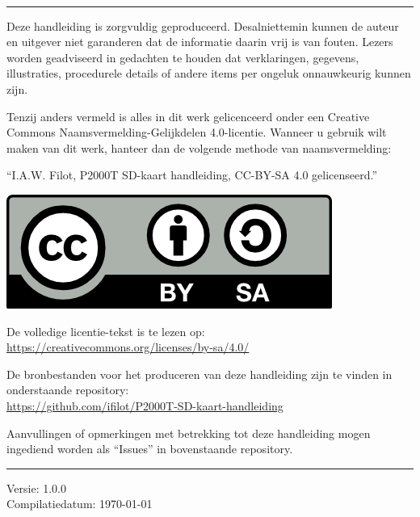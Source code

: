 ~\vfill

\begin{minipage}{1.0\textwidth}

\thispagestyle{empty}
\setlength{\parindent}{0pt}
\setlength{\parskip}{\baselineskip}

\noindent\rule{1.0\textwidth}{0.4pt}

Deze handleiding is zorgvuldig geproduceerd. Desalniettemin kunnen de auteur en uitgever niet garanderen dat de informatie daarin vrij is van fouten. Lezers worden geadviseerd in gedachten te houden dat verklaringen, gegevens, illustraties, procedurele details of andere items per ongeluk onnauwkeurig kunnen zijn.

Tenzij anders vermeld is alles in dit werk gelicenceerd onder een Creative Commons Naamsvermelding-Gelijkdelen 4.0-licentie. Wanneer u gebruik wilt maken van dit werk, hanteer dan de volgende methode van naamsvermelding:

``I.A.W. Filot, P2000T SD-kaart handleiding, CC-BY-SA 4.0 gelicenseerd.'' 

\includegraphics[]{img/by-sa.png}

De volledige licentie-tekst is te lezen op:\\
\url{https://creativecommons.org/licenses/by-sa/4.0/}

De bronbestanden voor het produceren van deze handleiding zijn te vinden in onderstaande repository:\\
\faGithub\;\url{https://github.com/ifilot/P2000T-SD-kaart-handleiding}

Aanvullingen of opmerkingen met betrekking tot deze handleiding mogen ingediend worden als ``Issues'' in bovenstaande repository.

\noindent\rule{1.0\textwidth}{0.4pt}
Versie: 1.0.0\\
Compilatiedatum: \today

\end{minipage}